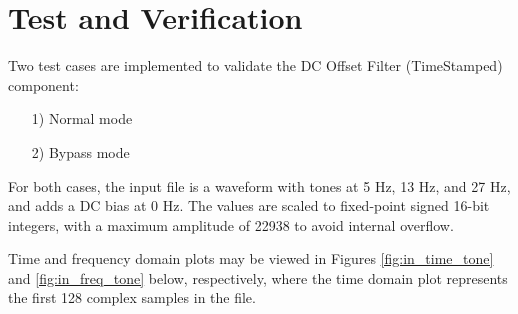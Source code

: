 \documentclass{article}
\def\Comp{DC Offset Filter (TimeStamped)}
\begin{document}
\section*{Test and Verification}
\normalsize
Two test cases are implemented to validate the \Comp{} component:
\begin{itemize}
	\item[1)] Normal mode
	\item[2)] Bypass mode
\end{itemize}
\noindent For both cases, the input file is a waveform with tones at 5 Hz, 13 Hz, and 27 Hz, and adds a DC bias at 0 Hz. The values are scaled to fixed-point signed 16-bit integers, with a maximum amplitude of 22938 to avoid internal overflow.\par\medskip
\noindent Time and frequency domain plots may be viewed in Figures \ref{fig:in_time_tone} and \ref{fig:in_freq_tone} below, respectively, where the time domain plot represents the first 128 complex samples in the file.
\end{document}
